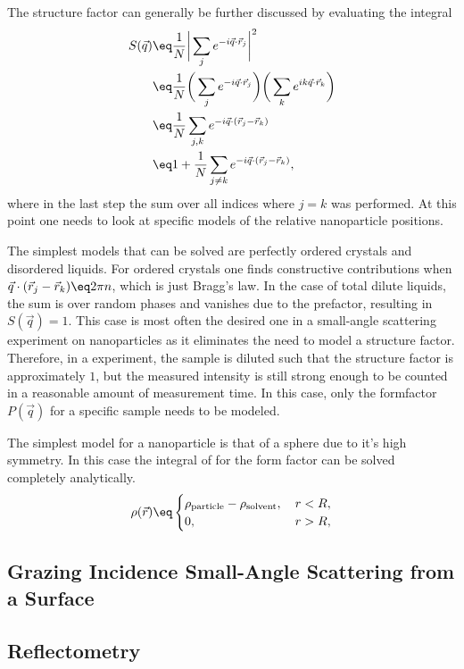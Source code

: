 \documentclass[\main/dresen_thesis.tex]{subfiles}
\begin{document}
The structure factor can generally be further discussed by evaluating the integral
\begin{align}
  S(\vec{q}) &\eq \frac{1}{N} \bigg| \sum_j  e^{-i\vec{q} \cdot \vec{r}_j} \bigg|^2\\
  &\eq \frac{1}{N}  \bigg( \sum_j  e^{-i\vec{q} \cdot \vec{r}_j} \bigg) \bigg( \sum_k  e^{i k\vec{q} \cdot \vec{r}_k} \bigg)\\
  &\eq \frac{1}{N}  \sum_{j, k}  e^{-i\vec{q} \cdot (\vec{r}_j - \vec{r}_k) }\\
  &\eq 1 + \frac{1}{N}  \sum_{j \neq k}  e^{-i\vec{q} \cdot (\vec{r}_j - \vec{r}_k)},
\end{align}
where in the last step the sum over all indices where $j=k$ was performed. 
At this point one needs to look at specific models of the relative nanoparticle positions.

The simplest models that can be solved are perfectly ordered crystals and disordered liquids.
For ordered crystals one finds constructive contributions when $\vec{q} \cdot (\vec{r}_j - \vec{r}_k) \eq 2 \pi n$, which is just Bragg's law. 
In the case of total dilute liquids, the sum is over random phases and vanishes due to the prefactor, resulting in $S(\vec{q}) = 1$. 
This case is most often the desired one in a small-angle scattering experiment on nanoparticles as it eliminates the need to model a structure factor. 
Therefore, in a experiment, the sample is diluted such that the structure factor is approximately $1$, but the measured intensity is still strong enough to be counted in a reasonable amount of measurement time. 
In this case, only the formfactor $P(\vec{q})$ for a specific sample needs to be modeled.

The simplest model for a nanoparticle is that of a sphere due to it's high symmetry. In this case the integral of for the form factor can be solved completely analytically.
\begin{equation}
  \rho(\vec{r}) \eq \begin{cases}
    \rho_\mathrm{particle} - \rho_\mathrm{solvent}, & \,r<R,\\
    0, & \, r>R,
 \end{cases}
\end{equation}
\subsection{Grazing Incidence Small-Angle Scattering from a Surface}\label{sec:theoreticalBackground:scattering:GISAS}
\subsection{Reflectometry}\label{sec:theoreticalBackground:scattering:reflectometry}
\end{document}
